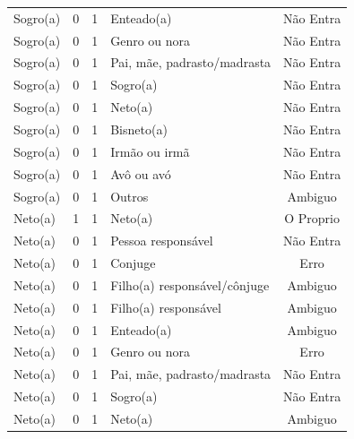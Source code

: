 \documentclass[
	12pt,				%
	openright,			%
	twoside,			%
	a4paper,			%
	english,			%
	french,				%
	spanish,			%
	brazil				%
	]{abntex2}
\begin{document}
\begin{anexosenv}
\begin{longtable}{@{}lcclc@{}}
Sogro(a)                     & 0         & 1        & Enteado(a)                   & Não Entra       \\
Sogro(a)                     & 0         & 1        & Genro ou nora                & Não Entra       \\
Sogro(a)                     & 0         & 1        & Pai, mãe, padrasto/madrasta  & Não Entra       \\
Sogro(a)                     & 0         & 1        & Sogro(a)                     & Não Entra       \\
Sogro(a)                     & 0         & 1        & Neto(a)                      & Não Entra       \\
Sogro(a)                     & 0         & 1        & Bisneto(a)                   & Não Entra       \\
Sogro(a)                     & 0         & 1        & Irmão ou irmã                & Não Entra       \\
Sogro(a)                     & 0         & 1        & Avô ou avó                   & Não Entra       \\
Sogro(a)                     & 0         & 1        & Outros                       & Ambiguo         \\
Neto(a)                      & 1         & 1        & Neto(a)                      & O Proprio       \\
Neto(a)                      & 0         & 1        & Pessoa responsável           & Não Entra       \\
Neto(a)                      & 0         & 1        & Conjuge                      & Erro            \\
Neto(a)                      & 0         & 1        & Filho(a) responsável/cônjuge & Ambiguo         \\
Neto(a)                      & 0         & 1        & Filho(a) responsável         & Ambiguo         \\
Neto(a)                      & 0         & 1        & Enteado(a)                   & Ambiguo         \\
Neto(a)                      & 0         & 1        & Genro ou nora                & Erro            \\
Neto(a)                      & 0         & 1        & Pai, mãe, padrasto/madrasta  & Não Entra       \\
Neto(a)                      & 0         & 1        & Sogro(a)                     & Não Entra       \\
Neto(a)                      & 0         & 1        & Neto(a)                      & Ambiguo         \\

\end{longtable}
\end{anexosenv}
\end{document}
